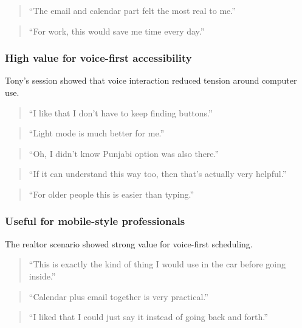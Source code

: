 \documentclass[12pt, titlepage]{article}
\begin{document}
\begin{quote}
``The email and calendar part felt the most real to me.''
\end{quote}

\begin{quote}
``For work, this would save me time every day.''
\end{quote}

\subsubsection{High value for voice-first accessibility}

Tony's session showed that voice interaction reduced tension around
computer use.

\begin{quote}
``I like that I don't have to keep finding buttons.''
\end{quote}

\begin{quote}
``Light mode is much better for me.''
\end{quote}

\begin{quote}
``Oh, I didn't know Punjabi option was also there.''
\end{quote}

\begin{quote}
``If it can understand this way too, then that's actually very
helpful.''
\end{quote}

\begin{quote}
``For older people this is easier than typing.''
\end{quote}

\subsubsection{Useful for mobile-style professionals}

The realtor scenario showed strong value for voice-first scheduling.

\begin{quote}
``This is exactly the kind of thing I would use in the car before going
inside.''
\end{quote}

\begin{quote}
``Calendar plus email together is very practical.''
\end{quote}

\begin{quote}
``I liked that I could just say it instead of going back and forth.''
\end{quote}
\end{document}
